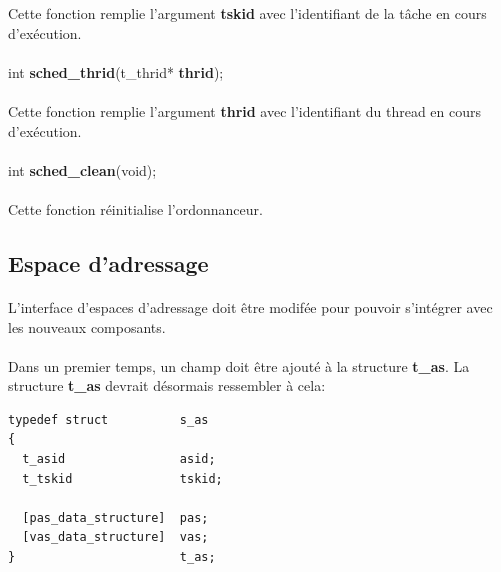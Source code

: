 \documentclass[10pt,a4wide]{article}
\begin{document}
Cette fonction remplie l'argument \textbf{tskid} avec l'identifiant de
la t\^ache en cours d'ex\'ecution.

\paragraph{}

\hspace{1.5cm}int \textbf{sched\_thrid}(t\_thrid* \textbf{thrid});

\paragraph{}

Cette fonction remplie l'argument \textbf{thrid} avec l'identifiant du
thread en cours d'ex\'ecution.

\paragraph{}

\hspace{1.5cm}int \textbf{sched\_clean}(void);

\paragraph{}

Cette fonction r\'einitialise l'ordonnanceur.

\subsection{Espace d'adressage}

\paragraph{}

L'interface d'espaces d'adressage doit \^etre modif\'ee pour pouvoir
s'int\'egrer avec les nouveaux composants.

\paragraph{}

Dans un premier temps, un champ doit \^etre ajout\'e \`a la structure
\textbf{t\_as}. La structure \textbf{t\_as} devrait d\'esormais ressembler \`a
cela:

\begin{verbatim}
typedef struct          s_as
{
  t_asid                asid;
  t_tskid               tskid;

  [pas_data_structure]  pas;
  [vas_data_structure]  vas;
}                       t_as;
\end{verbatim}
\end{document}
